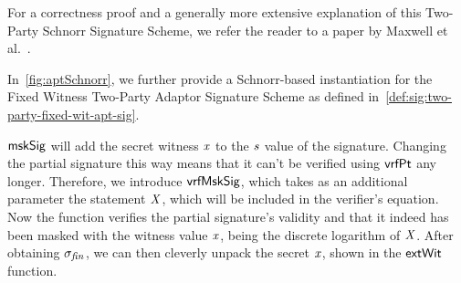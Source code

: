 For a correctness proof and a generally more extensive explanation of this Two-Party Schnorr Signature Scheme, we refer the reader to a paper by Maxwell et al.~\cite{maxwell2019simple}.

In~\cref{fig:aptSchnorr}, we further provide a Schnorr-based instantiation for the Fixed Witness Two-Party Adaptor Signature Scheme as defined in~\cref{def:sig:two-party-fixed-wit-apt-sig}.

$\mathsf{mskSig}$ will add the secret witness $\mathit{x}$ to the $\mathit{s}$ value of the signature.
Changing the partial signature this way means that it can't be verified using $\mathsf{vrfPt}$ any longer.
Therefore, we introduce $\mathsf{vrfMskSig}$, which takes as an additional parameter the statement $\mathit{X}$, which will be included in the verifier's equation.
Now the function verifies the partial signature's validity and that it indeed has been masked with the witness value $\mathit{x}$, being the discrete logarithm of $\mathit{X}$.
After obtaining $\sigma_{\mathit{fin}}$, we can then cleverly unpack the secret $\mathit{x}$, shown in the $\mathsf{extWit}$ function.

